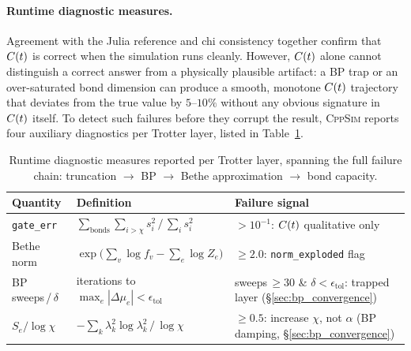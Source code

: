 \paragraph{Runtime diagnostic measures.}
Agreement with the Julia reference and chi consistency together confirm that
$C(t)$ is correct when the simulation runs cleanly.
However, $C(t)$ alone cannot distinguish a correct answer from a physically
plausible artifact: a BP trap or an over-saturated bond dimension can produce
a smooth, monotone $C(t)$ trajectory that deviates from the true value by
$5$--$10\%$ without any obvious signature in $C(t)$ itself.
To detect such failures before they corrupt the result, \textsc{CppSim} reports
four auxiliary diagnostics per Trotter layer, listed in
Table~\ref{tab:diagnostics}.

\begin{table}[ht]
\small\centering
\caption{Runtime diagnostic measures reported per Trotter layer,
  spanning the full failure chain: truncation $\to$ BP $\to$
  Bethe approximation $\to$ bond capacity.}
\label{tab:diagnostics}
\begin{tabular}{lll}
\toprule
Quantity & Definition & Failure signal \\
\midrule
\texttt{gate\_err} &
  $\sum_{\text{bonds}} \sum_{i>\chi} s_i^2 \,/\, \sum_i s_i^2$ &
  $> 10^{-1}$: $C(t)$ qualitative only \\
Bethe norm &
  $\exp\!\bigl(\sum_v \log f_v - \sum_e \log Z_e\bigr)$ &
  $\geq 2.0$: \texttt{norm\_exploded} flag \\
BP sweeps\,/\,$\delta$ &
  iterations to $\max_e|\Delta\mu_e| < \epsilon_{\mathrm{tol}}$ &
  sweeps\,$\geq 30$ \& $\delta < \epsilon_{\mathrm{tol}}$: trapped layer (\S\ref{sec:bp_convergence}) \\
$S_e / \log\chi$ &
  $-\sum_k \lambda_k^2 \log\lambda_k^2 \,/\, \log\chi$ &
  $\geq 0.5$: increase $\chi$, not $\alpha$ (BP damping, \S\ref{sec:bp_convergence}) \\
\bottomrule
\end{tabular}
\end{table}

